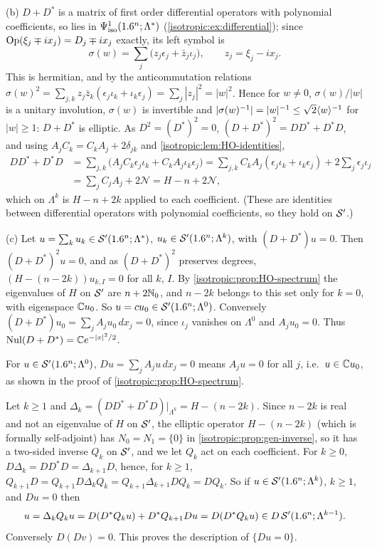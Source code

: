 (b) $D+D^*$ is a matrix of first order differential operators with polynomial
coefficients, so lies in $\Psi^{1}_{\mathrm{iso}}(1.6^n;\Lambda^*)$
(\cref{isotropic:ex:differential}); since $\operatorname{Op}(\xi_j\mp ix_j)=D_j\mp ix_j$
exactly, its left symbol is
\begin{equation*}
  \sigma(w)=\sum_j\bigl(z_j\epsilon_j+\bar z_j\iota_j\bigr),\qquad z_j=\xi_j-ix_j .
\end{equation*}
This is hermitian, and by the anticommutation relations
$\sigma(w)^2=\sum_{j,k}z_j\bar z_k(\epsilon_j\iota_k+\iota_k\epsilon_j)=\sum_j|z_j|^2=|w|^2$.
Hence for $w\ne0$, $\sigma(w)/|w|$ is a unitary involution, $\sigma(w)$ is invertible
and $|\sigma(w)^{-1}|=|w|^{-1}\le\sqrt2\langle w\rangle^{-1}$ for $|w|\ge1$: $D+D^*$ is
elliptic. As $D^2=(D^*)^2=0$, $(D+D^*)^2=DD^*+D^*D$, and using
$A_jC_k=C_kA_j+2\delta_{jk}$ and \cref{isotropic:lem:HO-identities},
\begin{equation*}
\begin{aligned}
  DD^*+D^*D&=\sum_{j,k}\bigl(A_jC_k\epsilon_j\iota_k+C_kA_j\iota_k\epsilon_j\bigr)
  =\sum_{j,k}C_kA_j(\epsilon_j\iota_k+\iota_k\epsilon_j)+2\sum_j\epsilon_j\iota_j\\
  &=\sum_jC_jA_j+2\mathcal N=H-n+2\mathcal N,
\end{aligned}
\end{equation*}
which on $\Lambda^k$ is $H-n+2k$ applied to each coefficient. (These are
identities between differential operators with polynomial coefficients, so they
hold on $\mathcal{S}'$.)

(c) Let $u=\sum_ku_k\in\mathcal{S}'(1.6^n;\Lambda^*)$, $u_k\in\mathcal{S}'(1.6^n;\Lambda^k)$, with
$(D+D^*)u=0$. Then $(D+D^*)^2u=0$, and as $(D+D^*)^2$ preserves degrees,
$(H-(n-2k))u_{k,I}=0$ for all $k$, $I$. By \cref{isotropic:prop:HO-spectrum} the
eigenvalues of $H$ on $\mathcal{S}'$ are $n+2\mathbb{N}_0$, and $n-2k$ belongs to this set only
for $k=0$, with eigenspace $\mathbb{C} u_0$. So $u=cu_0\in\mathcal{S}'(1.6^n;\Lambda^0)$.
Conversely $(D+D^*)u_0=\sum_jA_ju_0\,dx_j=0$, since $\iota_j$ vanishes on
$\Lambda^0$ and $A_ju_0=0$. Thus $\operatorname{Nul}(D+D^*)=\mathbb{C} e^{-|x|^2/2}$.

For $u\in\mathcal{S}'(1.6^n;\Lambda^0)$, $Du=\sum_jA_ju\,dx_j=0$ means $A_ju=0$ for all
$j$, i.e.\ $u\in\mathbb{C} u_0$, as shown in the proof of
\cref{isotropic:prop:HO-spectrum}.

Let $k\ge1$ and $\Delta_k=(DD^*+D^*D)|_{\Lambda^k}=H-(n-2k)$. Since $n-2k$ is real
and not an eigenvalue of $H$ on $\mathcal{S}'$, the elliptic operator $H-(n-2k)$ (which
is formally self-adjoint) has $N_0=N_1=\{0\}$ in \cref{isotropic:prop:gen-inverse},
so it has a two-sided inverse $Q_k$ on $\mathcal{S}'$, and we let $Q_k$ act on each
coefficient. For $k\ge0$, $D\Delta_k=DD^*D=\Delta_{k+1}D$, hence, for $k\ge1$,
$Q_{k+1}D=Q_{k+1}D\Delta_kQ_k=Q_{k+1}\Delta_{k+1}DQ_k=DQ_k$. So if
$u\in\mathcal{S}'(1.6^n;\Lambda^k)$, $k\ge1$, and $Du=0$ then
\begin{equation*}
  u=\Delta_kQ_ku=D(D^*Q_ku)+D^*Q_{k+1}Du=D(D^*Q_ku)\in D\,\mathcal{S}'(1.6^n;\Lambda^{k-1}).
\end{equation*}
Conversely $D(Dv)=0$. This proves the description of $\{Du=0\}$.

